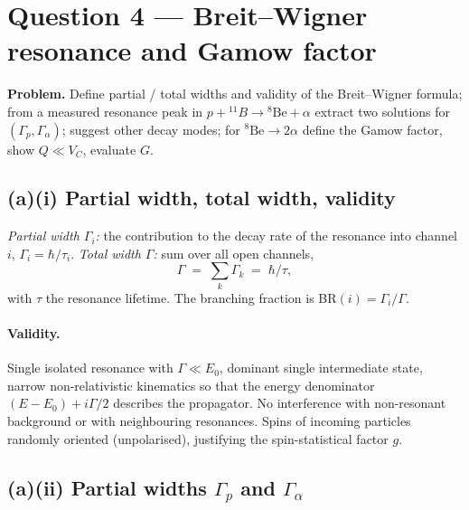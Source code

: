 \documentclass[11pt]{article}
\begin{document}
\section*{Question 4 --- Breit--Wigner resonance and Gamow factor}

\textbf{Problem.} Define partial / total widths and validity of the Breit--Wigner formula; from a measured resonance peak in $p+{}^{11}\!B\to{}^{8}\!\text{Be}+\alpha$ extract two solutions for $(\Gamma_{p},\Gamma_{\alpha})$; suggest other decay modes; for $^{8}\!\text{Be}\to 2\alpha$ define the Gamow factor, show $Q\ll V_{C}$, evaluate $G$.

\subsection*{(a)(i) Partial width, total width, validity}

\emph{Partial width $\Gamma_{i}$:} the contribution to the decay rate of the resonance into channel $i$, $\Gamma_{i}=\hbar/\tau_{i}$. \emph{Total width $\Gamma$:} sum over all open channels,
\[
\Gamma\;=\;\sum_{k}\Gamma_{k}\;=\;\hbar/\tau,
\]
with $\tau$ the resonance lifetime. The branching fraction is BR$(i)=\Gamma_{i}/\Gamma$.
\paragraph{Validity.} Single isolated resonance with $\Gamma\ll E_{0}$, dominant single intermediate state, narrow non-relativistic kinematics so that the energy denominator $(E-E_{0})+i\Gamma/2$ describes the propagator. No interference with non-resonant background or with neighbouring resonances. Spins of incoming particles randomly oriented (unpolarised), justifying the spin-statistical factor $g$.

\subsection*{(a)(ii) Partial widths $\Gamma_{p}$ and $\Gamma_{\alpha}$}
\end{document}
